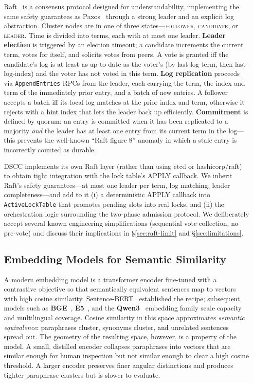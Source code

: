 \documentclass[sigconf]{acmart}
\begin{document}
Raft~\cite{raft} is a consensus protocol designed for understandability,
implementing the same safety guarantees as Paxos~\cite{paxos} through a
strong leader and an explicit log abstraction. Cluster nodes are in one of
three states---\textsc{follower}, \textsc{candidate}, or \textsc{leader}.
Time is divided into terms, each with at most one leader. \textbf{Leader
election} is triggered by an election timeout; a candidate increments the
current term, votes for itself, and solicits votes from peers. A vote is
granted iff the candidate's log is at least as up-to-date as the voter's
(by last-log-term, then last-log-index) and the voter has not voted in this
term. \textbf{Log replication} proceeds via \texttt{AppendEntries} RPCs from
the leader, each carrying the term, the index and term of the immediately
prior entry, and a batch of new entries. A follower accepts a batch iff its
local log matches at the prior index and term, otherwise it rejects with a
hint index that lets the leader back up efficiently. \textbf{Commitment} is
defined by quorum: an entry is committed when it has been replicated to a
majority \emph{and} the leader has at least one entry from its current
term in the log---this prevents the well-known ``Raft figure 8'' anomaly
in which a stale entry is incorrectly counted as durable.

DSCC implements its own Raft layer (rather than using etcd or hashicorp/raft)
to obtain tight integration with the lock table's APPLY callback. We inherit
Raft's safety guarantees---at most one leader per term, log matching,
leader completeness---and add to it (i) a deterministic APPLY callback into
\texttt{ActiveLockTable} that promotes pending slots into real locks, and
(ii) the orchestration logic surrounding the two-phase admission protocol.
We deliberately accept several known engineering simplifications (sequential
vote collection, no pre-vote) and discuss their implications
in \S\ref{sec:raft-limit} and \S\ref{sec:limitations}.

\subsection{Embedding Models for Semantic Similarity}
\label{sec:bg-embed}

A modern embedding model is a transformer encoder fine-tuned with a
contrastive objective so that semantically equivalent sentences map to
vectors with high cosine similarity. Sentence-BERT~\cite{reimers2019sbert}
established the recipe; subsequent models such as
\textbf{BGE}~\cite{bge}, \textbf{E5}~\cite{e5}, and the
\textbf{Qwen3}~\cite{qwen3} embedding family scale capacity and
multilingual coverage. Cosine similarity in this space approximates
\emph{semantic equivalence}: paraphrases cluster, synonyms cluster, and
unrelated sentences spread out. The geometry of the resulting space, however,
is a property of the model. A small, distilled encoder collapses
paraphrases into vectors that are similar enough for human inspection but
not similar enough to clear a high cosine threshold. A larger encoder
preserves finer angular distinctions and produces tighter paraphrase
clusters but is slower to evaluate.
\end{document}
